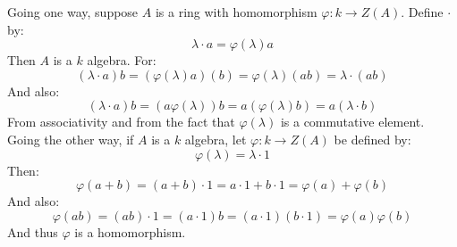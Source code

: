 \documentclass[crop=false,class=article]{standalone}                           %
\begin{document}
    \begin{solution}
        Going one way, suppose $A$ is a ring with homomorphism
        $\varphi:k\rightarrow{Z}(A)$. Define $\cdot$ by:
        \begin{equation}
            \lambda\cdot{a}=\varphi(\lambda)a
        \end{equation}
        Then $A$ is a $k$ algebra. For:
        \begin{equation}
            (\lambda\cdot{a})b
            =(\varphi(\lambda)a)(b)
            =\varphi(\lambda)(ab)
            =\lambda\cdot(ab)
        \end{equation}
        And also:
        \begin{equation}
            (\lambda\cdot{a})b
            =(a\varphi(\lambda))b
            =a(\varphi(\lambda)b)
            =a(\lambda\cdot{b})
        \end{equation}
        From associativity and from the fact that $\varphi(\lambda)$ is
        a commutative element. Going the other way, if $A$ is a $k$ algebra,
        let $\varphi:k\rightarrow{Z}(A)$ be defined by:
        \begin{equation}
            \varphi(\lambda)=\lambda\cdot{1}
        \end{equation}
        Then:
        \begin{equation}
            \varphi(a+b)
            =(a+b)\cdot{1}
            =a\cdot{1}+b\cdot{1}
            =\varphi(a)+\varphi(b)
        \end{equation}
        And also:
        \begin{equation}
            \varphi(ab)
            =(ab)\cdot{1}
            =(a\cdot{1})b
            =(a\cdot{1})(b\cdot{1})
            =\varphi(a)\varphi(b)
        \end{equation}
        And thus $\varphi$ is a homomorphism.
    \end{solution}
\end{document}
